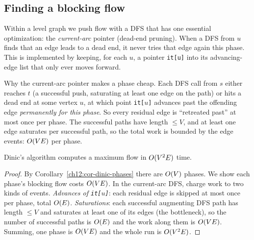 \subsection{Finding a blocking flow}

Within a level graph we push flow with a DFS that has one essential optimization:
the \emph{current-arc} pointer (dead-end pruning). When a DFS from $u$ finds that
an edge leads to a dead end, it never tries that edge again this phase. This is
implemented by keeping, for each $u$, a pointer \texttt{it[u]} into its
advancing-edge list that only ever moves forward.

\begin{algorithm}[H]
\caption{\textsc{Dinic} -- one phase, blocking flow by current-arc DFS}
\label{ch12:alg-dinic}
\BlankLine
{}
\end{algorithm}

\begin{whybox}
Why the current-arc pointer makes a phase cheap. Each DFS call from $s$ either
reaches $t$ (a successful push, saturating at least one edge on the path) or hits a
dead end at some vertex $u$, at which point \texttt{it[}$u$\texttt{]} advances past
the offending edge \emph{permanently for this phase}. So every residual edge is
``retreated past'' at most once per phase. The successful paths have length
$\le V$, and at least one edge saturates per successful path, so the total work is
bounded by the edge events: $O(VE)$ per phase.
\end{whybox}

\begin{theorem}
\label{ch12:thm-dinic}
Dinic's algorithm computes a maximum flow in $O(V^2 E)$ time.
\end{theorem}

\begin{proof}
By Corollary~\ref{ch12:cor-dinic-phases} there are $O(V)$ phases. We show each
phase's blocking flow costs $O(VE)$. In the current-arc DFS, charge work to two
kinds of events. \emph{Advances of \texttt{it[}$u$\texttt{]}}: each residual edge
is skipped at most once per phase, total $O(E)$. \emph{Saturations}: each
successful augmenting DFS path has length $\le V$ and saturates at least one of its
edges (the bottleneck), so the number of successful paths is $O(E)$ and the work
along them is $O(VE)$. Summing, one phase is $O(VE)$ and the whole run is
$O(V^2E)$.
\end{proof}


